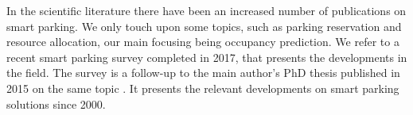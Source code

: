 

In the scientific literature there have been an increased number of publications on smart parking. We only touch upon some topics, such as parking reservation and resource allocation, our main focusing being occupancy prediction. We refer to a recent smart parking survey completed in 2017, that presents the developments in the field. The survey \cite{lin} is a follow-up to the main author's PhD thesis published in 2015 on the same topic \cite{lin2}. It presents the relevant developments on smart parking solutions since 2000. %



